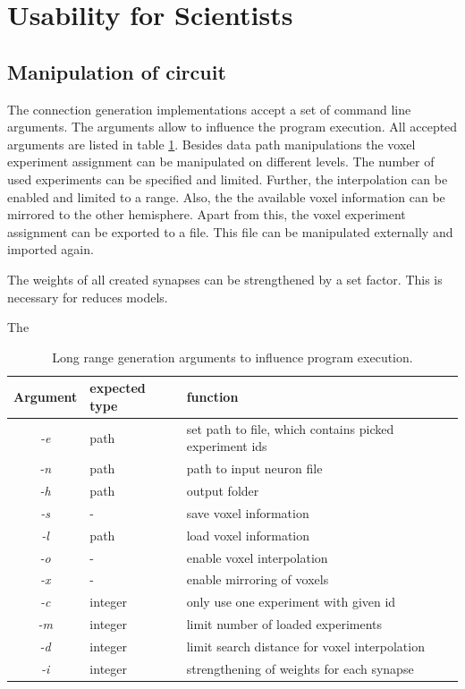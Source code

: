 \newpage
\section{Usability for Scientists}

\subsection{Manipulation of circuit}

The connection generation implementations accept a set of command line arguments.
The arguments allow to influence the program execution.
All accepted arguments are listed in table \ref{tab:longrangeargs}.
Besides data path manipulations the voxel experiment assignment can be 
manipulated on different levels. The number of used experiments can be specified
and limited. Further, the interpolation can be enabled and limited to a range.
Also, the the available voxel information can be mirrored to the other hemisphere.
Apart from this, the voxel experiment assignment can be exported to a file.
This file can be manipulated externally and imported again.

The weights of all created synapses can be strengthened by a set factor.
This is necessary for reduces models.

The 
\begin{table}[ht!]
\begin{centering}
    \begin{tabular}{ | c | l | p{7cm} |}
    \hline
    Argument & expected type & function \\ \hline \hline
    \emph{-e} & path & set path to file, which contains picked experiment ids \\ \hline
    \emph{-n} & path & path to input neuron file \\ \hline
    \emph{-h} & path &  output folder\\ \hline
    \emph{-s} & - &  save voxel information\\ \hline
    \emph{-l} & path &  load voxel information\\ \hline
    \emph{-o} & - &  enable voxel interpolation\\ \hline
    \emph{-x} & - &  enable mirroring of voxels\\ \hline
    \emph{-c} & integer & only use one experiment with given id \\ \hline
    \emph{-m} & integer & limit number of loaded experiments \\ \hline
    \emph{-d} & integer & limit search distance for voxel interpolation \\ \hline
    \emph{-i} & integer & strengthening of weights for each synapse \\ \hline
    \end{tabular}
    \caption{Long range generation arguments to influence program execution.}
    \label{tab:longrangeargs}
\end{centering}
\end{table}

